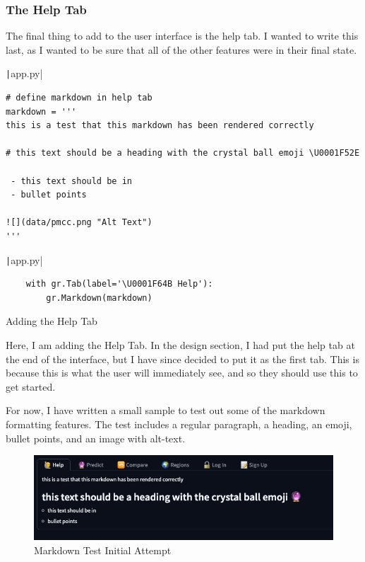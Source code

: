 \documentclass[12pt]{report}
\newcommand{\pil}[1]{\protect\texttt|#1|}
\begin{document}
\subsubsection{The Help Tab}
The final thing to add to the user interface is the help tab. I wanted to write this last, as I wanted to be sure that all of the other features were in their final state.

\begin{listing}[H]
\pil{app.py}
\begin{verbatim}
# define markdown in help tab
markdown = '''
this is a test that this markdown has been rendered correctly

# this text should be a heading with the crystal ball emoji \U0001F52E

 - this text should be in
 - bullet points
 
![](data/pmcc.png "Alt Text")
'''
\end{verbatim}
\pil{app.py}
\begin{verbatim}
    with gr.Tab(label='\U0001F64B Help'):
        gr.Markdown(markdown)
\end{verbatim}
\caption{Adding the Help Tab}\label{cs:helpTab}
\end{listing}

Here, I am adding the Help Tab. In the design section, I had put the help tab at the end of the interface, but I have since decided to put it as the first tab. This is because this is what the user will immediately see, and so they should use this to get started.

For now, I have written a small sample to test out some of the markdown formatting features. The test includes a regular paragraph, a heading, an emoji, bullet points, and an image with alt-text.

\begin{figure}[H]
\centering
\includegraphics[width=14cm]{ss22.15.png}
\caption{Markdown Test Initial Attempt}\label{fig:ss22.15}
\end{figure}
\end{document}
